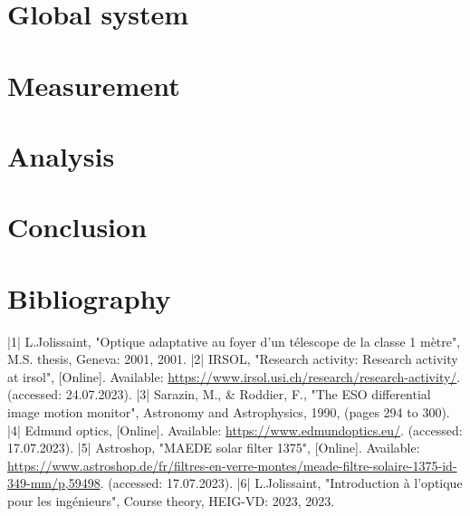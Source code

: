 \documentclass[
    iai, %
    mi, %
]{heig-tb}
\begin{document}
\chapter{Global system}


\chapter{Measurement}


\chapter{Analysis}


\chapter{Conclusion}


\clearpage
\chapter*{Bibliography}
|1| L.Jolissaint, "Optique adaptative au foyer d'un télescope de la classe 1 mètre", M.S. thesis, Geneva: 2001, 2001.
\bigbreak
|2| IRSOL, "Research activity: Research activity at irsol", [Online]. \newline Available: \hyperlink{IRSOL website}{https://www.irsol.usi.ch/research/research-activity/}. (accessed: 24.07.2023).
\bigbreak
|3| Sarazin, M., & Roddier, F., "The ESO differential image motion monitor", Astronomy and Astrophysics, 1990, (pages 294 to 300).
\bigbreak
|4| Edmund optics, [Online]. Available: \hyperlink{Edmund optics website}{https://www.edmundoptics.eu/}. (accessed: 17.07.2023).
\bigbreak
|5| Astroshop, "MAEDE solar filter 1375", [Online]. Available: \hyperlink{Astroshop website}{https://www.astroshop.de/fr/filtres-en-verre-montes/meade-filtre-solaire-1375-id-349-mm/p,59498}. (accessed: 17.07.2023).
\bigbreak
|6| L.Jolissaint, "Introduction à l'optique pour les ingénieurs", Course theory, HEIG-VD: 2023, 2023.

\label{glossaire}
\printnoidxglossary
\label{index}
\printindex

\appendix
\appendixpage
\addappheadtotoc



% 
\end{document}
